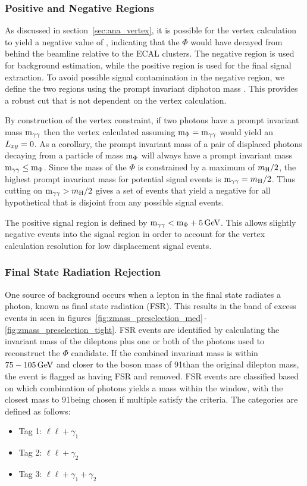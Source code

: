 \subsubsection{Positive and Negative \lxy Regions} \label{sec:ana_lxyregions}
As discussed in section~\ref{sec:ana_vertex}, it is possible for the vertex calculation to yield a negative value of \lxy, indicating that the $\Phi$ would have decayed from behind the beamline relative to the ECAL clusters. The negative \lxy region is used for background estimation, while the positive \lxy region is used for the final signal extraction. To avoid possible signal contamination in the negative \lxy region, we define the two regions using the prompt invariant diphoton mass \mgg. This provides a robust cut that is not dependent on the vertex calculation.

By construction of the vertex constraint, if two photons have a prompt invariant mass $\text{m}_{\gamma\gamma}$ then the vertex calculated assuming $\text{m}_\Phi=\text{m}_{\gamma\gamma}$ would yield an $L_{xy}=0$. As a corollary, the prompt invariant mass of a pair of displaced photons decaying from a particle of mass $\text{m}_\Phi$ will always have a prompt invariant mass $\text{m}_{\gamma\gamma}\leq\text{m}_\Phi$. Since the mass of the $\Phi$ is constrained by a maximum of $m_{\mathrm{H}}\space/2$, the highest prompt invariant mass for potential signal events is $\text{m}_{\gamma\gamma}=m_{\mathrm{H}}\space/2$. Thus cutting on $\text{m}_{\gamma\gamma}>m_{\mathrm{H}}\space/2$ gives a set of events that yield a negative \lxy for all hypothetical \mphi that is disjoint from any possible signal events.

The positive \lxy signal region is defined by $\text{m}_{\gamma\gamma}<\text{m}_\Phi+5\,\text{Ge\hspace{-.08em}V}$. This allows slightly negative \lxy events into the signal region in order to account for the vertex calculation resolution for low displacement signal events.

\subsubsection{Final State Radiation Rejection} \label{sec:ana_fsr}
One source of background occurs when a lepton in the final state radiates a photon, known as final state radiation (FSR). This results in the band of excess events in \mll seen in figures~\ref{fig:zmass_preselection_med}$\,$-$\,$\ref{fig:zmass_preselection_tight}. FSR events are identified by calculating the invariant mass of the dileptons plus one or both of the photons used to reconstruct the $\Phi$ candidate. If the combined invariant mass is within $75-105\,\text{Ge\hspace{-.08em}V}$ and closer to the \PZ boson mass of 91\GeV than the original dilepton mass, the event is flagged as having FSR and removed. FSR events are classified based on which combination of photons yields a mass within the \PZ window, with the closest mass to 91\GeV being chosen if multiple satisfy the criteria. The categories are defined as follows:
\begin{itemize}
	\item Tag 1: $\ell\ell+\gamma_1$
	\item Tag 2: $\ell\ell+\gamma_2$
	\item Tag 3: $\ell\ell+\gamma_1+\gamma_2$
\end{itemize}


